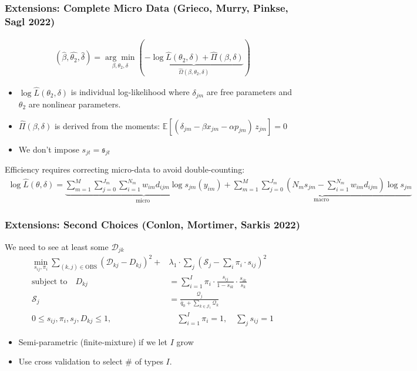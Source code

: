 \begin{frame} \frametitle{Extensions: Complete Micro Data (Grieco, Murry, Pinkse, Sagl 2022)}
\footnotesize
\begin{align*}
(\hat{\beta}, \hat{\theta_2}, \hat{\delta})=\underset{\beta, \theta_2, \delta}{\arg \min }(\underbrace{-\log \hat{L}(\theta_2, \delta)+\hat{\Pi}(\beta, \delta)}_{\hat{\Omega}(\beta, \theta_2, \delta)})
\end{align*}
\begin{itemize}
\item $\log \hat{L}(\theta_2, \delta)$ is individual log-likelihood where $\delta_{jm}$ are free parameters and $\theta_2$ are nonlinear parameters.
\item $\hat{\Pi}(\beta,\delta)$ is derived from the moments: $\mathbb{E}[\left(\delta_{jm}-\beta x_{jm} - \alpha p_{jm}\right)\, z_{jm}]=0$
\item We don't impose $s_{jt} = \mathfrak{s}_{jt}$
\end{itemize}
Efficiency requires correcting micro-data to avoid double-counting:
\begin{align*}
\log \hat{L}(\theta, \delta)=\underbrace{\sum_{m=1}^M \sum_{j=0}^{J_m} \sum_{i=1}^{N_m} w_{i m} d_{i j m} \log s_{j m}(y_{i m})}_{\text {micro }}+\underbrace{\sum_{m=1}^M \sum_{j=0}^{J_m}\left(N_m s_{j m}-\sum_{i=1}^{N_m} w_{i m} d_{i j m}\right) \log s_{j m}}_{\text {macro }}
\end{align*}
\end{frame}

\begin{frame} \frametitle{Extensions: Second Choices (Conlon, Mortimer, Sarkis 2022)}
\small
We need to see at least some $\mathcal{D}_{jk}$
\begin{align*}
\min_{s_{ij}, \pi_i}\sum_{(k,j) \in \text{OBS}} \left( \mathcal{D}_{kj} - D_{kj}\right)^2+ & \lambda_1 \cdot  \sum_j \left(\mathcal{S}_j - \sum_i \pi_i \cdot s_{ij} \right)^2\\ %
\text{subject to} \quad 
\nonumber    D_{kj} &= \sum_{i=1}^I \pi_i \cdot \frac{s_{ij}}{1-s_{ik}} \cdot \frac{s_{ik}}{s_{k}}\\
\nonumber    \mathcal{S}_j &= \frac{\mathcal{Q}_j }{\overline{q}_0 +\sum_{k \in \mathcal{J}_t} \mathcal{Q}_k}  \\
\nonumber   0\leq s_{ij}, \pi_i, s_j, D_{kj} \leq 1,& \quad
   \sum_{i=1}^I \pi_i = 1,\quad
   \sum_j s_{ij} = 1 
\end{align*}
\vspace{-.25cm}
\begin{itemize} 
  \item Semi-parametric (finite-mixture) if we let $I$ grow
\item Use cross validation to select \# of types $I$.
\end{itemize}
\end{frame}




